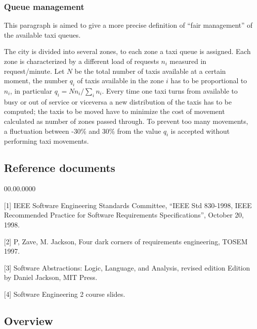 \subsubsection{Queue management}

This paragraph is aimed to give a more precise definition of ``fair
management'' of the available taxi queues.

The city is divided into several zones, to each zone a taxi queue
is assigned. Each zone is characterized by a different load of requests
$n_{i}$ measured in request/minute. Let $N$ be the total number
of taxis available at a certain moment, the number $q_{i}$ of taxis
available in the zone $i$ has to be proportional to $n_{i}$, in
particular $q_{i}=Nn_{i}/\sum_{i}n_{i}$. Every time one taxi turns
from available to busy or out of service or viceversa a new distribution
of the taxis has to be computed; the taxis to be moved have to minimize
the cost of movement calculated as number of zones passed through.
To prevent too many movements, a fluctuation between -30\% and 30\%
from the value $q_{i}$ is accepted without performing taxi movements.


\subsection{Reference documents }
\begin{lyxlist}{00.00.0000}
\item [{{[}1{]}}] IEEE Software Engineering Standards Committee, “IEEE
Std 830-1998, IEEE Recommended Practice for Software Requirements
Specifications”, October 20, 1998. 
\item [{{[}2{]}}] P, Zave, M. Jackson, Four dark corners of requirements
engineering, TOSEM 1997.
\item [{{[}3{]}}] Software Abstractions: Logic, Language, and Analysis,
revised edition Edition by Daniel Jackson, MIT Press.
\item [{{[}4{]}}] Software Engineering 2 course slides.
\end{lyxlist}

\subsection{Overview}


